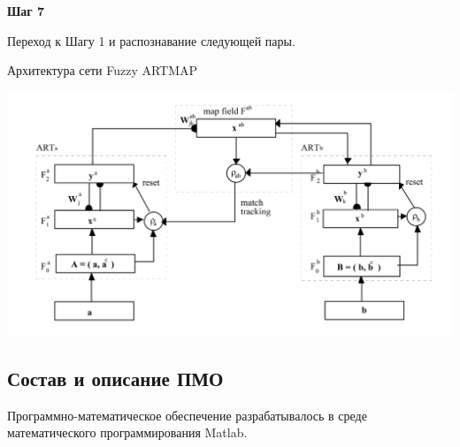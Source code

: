 \textbf{Шаг 7}

Переход к Шагу 1 и распознавание следующей пары.

\begin{center}
	Архитектура сети Fuzzy ARTMAP

	\includegraphics[width=14cm]{image_for_report/scheme.jpg}
\end{center}




\subsection{Состав и описание ПМО}

Программно-математическое обеспечение разрабатывалось в среде математического программирования Matlab.

